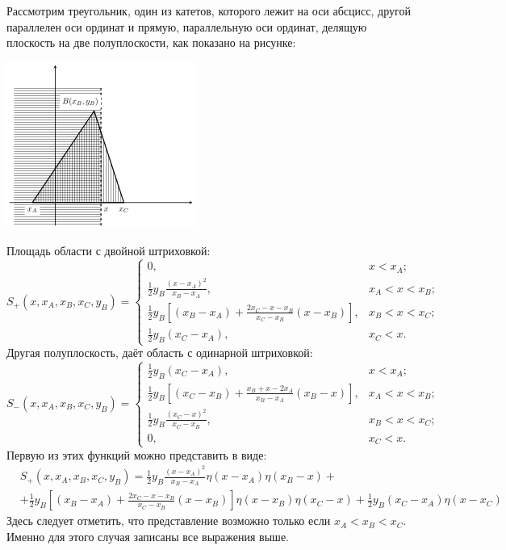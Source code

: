 Рассмотрим треугольник, один из катетов, которого лежит на оси абсцисс, другой параллелен оси ординат и прямую, параллельную оси ординат, делящую плоскость на две полуплоскости, как показано на рисунке:
\begin{center}
	\includegraphics{images/png/triangle_func.png}
\end{center}
Площадь области с двойной штриховкой:
\[
	S_+(x, x_A, x_B, x_C, y_B) = 
	\begin{cases}
	0, & x < x_A; \\
	\frac{1}{2} y_B \frac{(x - x_A)^2}{x_B - x_A}, & x_A < x < x_B; \\
	\frac{1}{2} y_B \left[(x_B - x_A) + \frac{2 x_C - x - x_B}{x_C - x_B} (x - x_B)\right] , & x_B < x < x_C; \\
	\frac{1}{2} y_B (x_C - x_A), & x_C < x.
	\end{cases}
\]
Другая полуплоскость, даёт область с одинарной штриховкой:
\[
S_-(x, x_A, x_B, x_C, y_B) = 
\begin{cases}
\frac{1}{2} y_B (x_C - x_A), & x < x_A; \\
\frac{1}{2} y_B \left[(x_C - x_B) + \frac{x_B + x - 2 x_A}{x_B - x_A} (x_B - x)\right], & x_A < x < x_B; \\
\frac{1}{2} y_B \frac{(x_C - x)^2}{x_C - x_B} , & x_B < x < x_C; \\
0, & x_C < x.
\end{cases}
\]
Первую из этих функций можно представить в виде:
\[
	\begin{aligned}
	& S_+(x, x_A, x_B, x_C, y_B) =  
	\frac{1}{2} y_B \frac{(x - x_A)^2}{x_B - x_A} \eta(x - x_A) \eta(x_B - x)  + \\ & +
	\frac{1}{2} y_B \left[(x_B - x_A) + \frac{2 x_C - x - x_B}{x_C - x_B} (x - x_B)\right] \eta(x - x_B) \eta(x_C - x) +
	\frac{1}{2} y_B (x_C - x_A) \eta(x - x_C)
	\end{aligned}
\]
Здесь следует отметить, что представление возможно только если $x_A < x_B < x_C$. Именно для этого случая записаны все выражения выше.